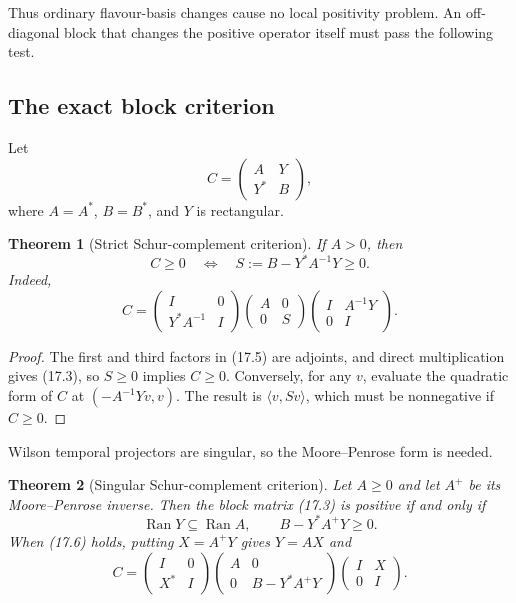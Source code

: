 \documentclass[11pt]{article}
\newtheorem{theorem}{Theorem}[section]
\theoremstyle{remark}
\begin{document}
Thus ordinary flavour-basis changes cause no local positivity problem.
An off-diagonal block that changes the positive operator itself must pass
the following test.

\subsection{The exact block criterion}

Let
\[
 C=\begin{pmatrix}A&Y\\Y^*&B\end{pmatrix},                    \tag{17.3}
\]
where \(A=A^*\), \(B=B^*\), and \(Y\) is rectangular.

\begin{theorem}[Strict Schur-complement criterion]
\label{thm:v19v14-strict-schur}
If \(A>0\), then
\[
 C\geq0
 \quad\Longleftrightarrow\quad
 S:=B-Y^*A^{-1}Y\geq0.                                       \tag{17.4}
\]
Indeed,
\[
 C=
 \begin{pmatrix}I&0\\Y^*A^{-1}&I\end{pmatrix}
 \begin{pmatrix}A&0\\0&S\end{pmatrix}
 \begin{pmatrix}I&A^{-1}Y\\0&I\end{pmatrix}.                  \tag{17.5}
\]
\end{theorem}

\begin{proof}
The first and third factors in (17.5) are adjoints, and direct
multiplication gives (17.3), so \(S\geq0\) implies \(C\geq0\).
Conversely, for any \(v\), evaluate the quadratic form of \(C\) at
\((-A^{-1}Yv,v)\).  The result is \(\langle v,Sv\rangle\), which must be
nonnegative if \(C\geq0\).
\end{proof}

Wilson temporal projectors are singular, so the Moore--Penrose form is
needed.

\begin{theorem}[Singular Schur-complement criterion]
\label{thm:v19v14-singular-schur}
Let \(A\geq0\) and let \(A^+\) be its Moore--Penrose inverse.  Then the
block matrix (17.3) is positive if and only if
\[
 \operatorname{Ran}Y\subseteq\operatorname{Ran}A,\qquad
 B-Y^*A^+Y\geq0.                                               \tag{17.6}
\]
When (17.6) holds, putting \(X=A^+Y\) gives \(Y=AX\) and
\[
 C=
 \begin{pmatrix}I&0\\X^*&I\end{pmatrix}
 \begin{pmatrix}A&0\\0&B-Y^*A^+Y\end{pmatrix}
 \begin{pmatrix}I&X\\0&I\end{pmatrix}.                         \tag{17.7}
\]
\end{theorem}
\end{document}
